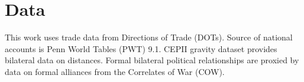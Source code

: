 \section{Data}
This work uses trade data from Directions of Trade (DOTs). Source of national accounts is Penn World Tables (PWT) 9.1. CEPII gravity dataset provides bilateral data on distances. Formal bilateral political relationships are proxied by data on formal alliances from the Correlates of War (COW).
